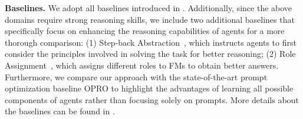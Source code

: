 \documentclass{article} %
\begin{document}
\noindent\textbf{Baselines.}\hspace{0.5em} We adopt all baselines introduced in .
Additionally, since the above domains require strong reasoning skills, we include two additional baselines that specifically focus on enhancing the reasoning capabilities of agents for a more thorough comparison: (1) Step-back Abstraction~\citep{zheng2023stepback}, which instructs agents to first consider the principles involved in solving the task for better reasoning; (2) Role Assignment~\citep{xu2023expertprompting}, which assigns different roles to FMs to obtain better answers. Furthermore, we compare our approach with the state-of-the-art prompt optimization baseline OPRO \citep{yang2024OPRO} to highlight the advantages of learning all possible components of agents rather than focusing solely on prompts. More details about the baselines can be found in .
\end{document}
